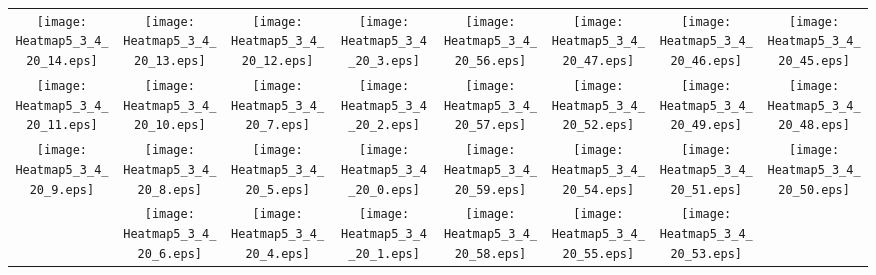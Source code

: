 \documentclass{standalone}
\begin{document}
\begin{tabular}{ *8{c} }
\texttt{[image: Heatmap5\_3\_4\_20\_14.eps]} & \texttt{[image: Heatmap5\_3\_4\_20\_13.eps]} & \texttt{[image: Heatmap5\_3\_4\_20\_12.eps]} & \texttt{[image: Heatmap5\_3\_4\_20\_3.eps]} & \texttt{[image: Heatmap5\_3\_4\_20\_56.eps]} & \texttt{[image: Heatmap5\_3\_4\_20\_47.eps]} & \texttt{[image: Heatmap5\_3\_4\_20\_46.eps]} & \texttt{[image: Heatmap5\_3\_4\_20\_45.eps]} \\
\texttt{[image: Heatmap5\_3\_4\_20\_11.eps]} & \texttt{[image: Heatmap5\_3\_4\_20\_10.eps]} & \texttt{[image: Heatmap5\_3\_4\_20\_7.eps]} & \texttt{[image: Heatmap5\_3\_4\_20\_2.eps]} & \texttt{[image: Heatmap5\_3\_4\_20\_57.eps]} & \texttt{[image: Heatmap5\_3\_4\_20\_52.eps]} & \texttt{[image: Heatmap5\_3\_4\_20\_49.eps]} & \texttt{[image: Heatmap5\_3\_4\_20\_48.eps]} \\
\texttt{[image: Heatmap5\_3\_4\_20\_9.eps]} & \texttt{[image: Heatmap5\_3\_4\_20\_8.eps]} & \texttt{[image: Heatmap5\_3\_4\_20\_5.eps]} & \texttt{[image: Heatmap5\_3\_4\_20\_0.eps]} & \texttt{[image: Heatmap5\_3\_4\_20\_59.eps]} & \texttt{[image: Heatmap5\_3\_4\_20\_54.eps]} & \texttt{[image: Heatmap5\_3\_4\_20\_51.eps]} & \texttt{[image: Heatmap5\_3\_4\_20\_50.eps]} \\
 & \texttt{[image: Heatmap5\_3\_4\_20\_6.eps]} & \texttt{[image: Heatmap5\_3\_4\_20\_4.eps]} & \texttt{[image: Heatmap5\_3\_4\_20\_1.eps]} & \texttt{[image: Heatmap5\_3\_4\_20\_58.eps]} & \texttt{[image: Heatmap5\_3\_4\_20\_55.eps]} & \texttt{[image: Heatmap5\_3\_4\_20\_53.eps]} &  
\end{tabular}
\end{document}
